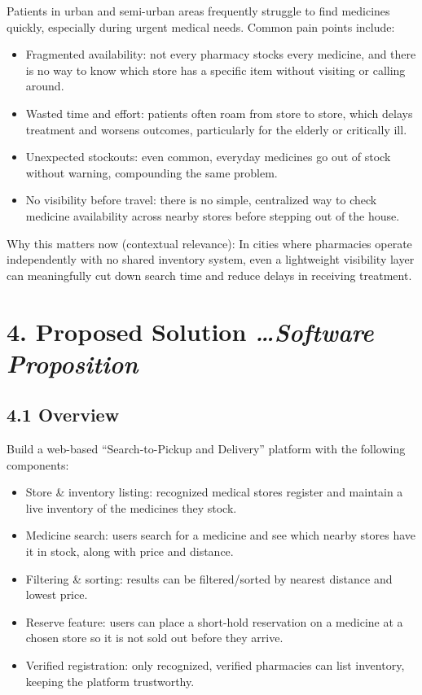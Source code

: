 \documentclass[
]{article}
\begin{document}
Patients in urban and semi-urban areas frequently struggle to find
medicines quickly, especially during urgent medical needs. Common pain
points include:

\begin{itemize}
\item
  Fragmented availability: not every pharmacy stocks every medicine, and
  there is no way to know which store has a specific item without
  visiting or calling around.
\item
  Wasted time and effort: patients often roam from store to store, which
  delays treatment and worsens outcomes, particularly for the elderly or
  critically ill.
\item
  Unexpected stockouts: even common, everyday medicines go out of stock
  without warning, compounding the same problem.
\item
  No visibility before travel: there is no simple, centralized way to
  check medicine availability across nearby stores before stepping out
  of the house.
\end{itemize}

Why this matters now (contextual relevance): In cities where pharmacies
operate independently with no shared inventory system, even a
lightweight visibility layer can meaningfully cut down search time and
reduce delays in receiving treatment.

\section{\texorpdfstring{\textbf{4. Proposed Solution}
\emph{\ldots Software
Proposition}}{4. Proposed Solution \ldots Software Proposition}}\label{proposed-solution-software-proposition}

\subsection{\texorpdfstring{\textbf{4.1
Overview}}{4.1 Overview}}\label{overview}

Build a web-based ``Search-to-Pickup and Delivery'' platform with the
following components:

\begin{itemize}
\item
  Store \& inventory listing: recognized medical stores register and
  maintain a live inventory of the medicines they stock.
\item
  Medicine search: users search for a medicine and see which nearby
  stores have it in stock, along with price and distance.
\item
  Filtering \& sorting: results can be filtered/sorted by nearest
  distance and lowest price.
\item
  Reserve feature: users can place a short-hold reservation on a
  medicine at a chosen store so it is not sold out before they arrive.
\item
  Verified registration: only recognized, verified pharmacies can list
  inventory, keeping the platform trustworthy.
\end{itemize}
\end{document}

